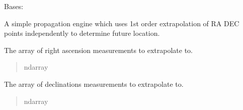 \documentclass[letterpaper,11pt,english]{sphinxmanual}
\begin{document}
\begin{savenotes}\begin{fulllineitems}
\label{\detokenize{code/opihiexarata.propagate.polynomial:opihiexarata.propagate.polynomial.LinearPropagationEngine}}
\pysigstartsignatures
{}
\pysigstopsignatures
\sphinxAtStartPar
Bases: {\hyperref[\detokenize{code/opihiexarata.library.engine:opihiexarata.library.engine.PropagationEngine}]{}}

\sphinxAtStartPar
A simple propagation engine which uses 1st order extrapolation of
RA DEC points independently to determine future location.

\begin{savenotes}\begin{fulllineitems}
\label{\detokenize{code/opihiexarata.propagate.polynomial:opihiexarata.propagate.polynomial.LinearPropagationEngine.ra_array}}
\pysigstartsignatures
{}
\pysigstopsignatures
\sphinxAtStartPar
The array of right ascension measurements to extrapolate to.
\begin{quote}\begin{description}
\sphinxAtStartPar
ndarray

\end{description}\end{quote}

\end{fulllineitems}\end{savenotes}


\begin{savenotes}\begin{fulllineitems}
\label{\detokenize{code/opihiexarata.propagate.polynomial:opihiexarata.propagate.polynomial.LinearPropagationEngine.dec_array}}
\pysigstartsignatures
{}
\pysigstopsignatures
\sphinxAtStartPar
The array of declinations measurements to extrapolate to.
\begin{quote}\begin{description}
\sphinxAtStartPar
ndarray


\end{description}
\end{quote}
\end{fulllineitems}
\end{savenotes}
\end{fulllineitems}
\end{savenotes}
\end{document}

